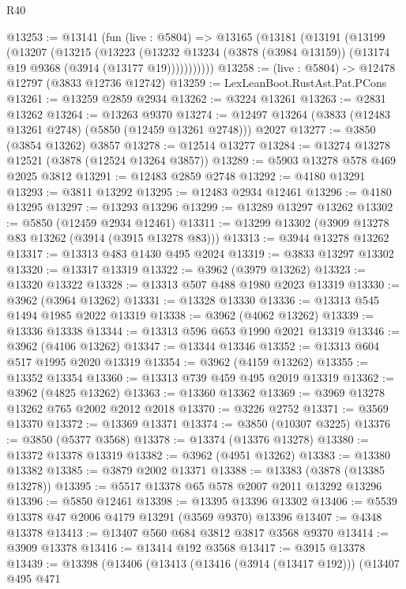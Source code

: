 \begin{lexlean}{R40}
\begin{coremodule}
@13253 := @13141
    (fun (live : @5804) =>
    @13165
      (@13181
        (@13191
          (@13199
            (@13207
              (@13215
                (@13223
                  (@13232
                    @13234
                    (@3878 (@3984 @13159))
                    (@13174 @19 @9368 (@3914 (@13177 @19)))))))))))
@13258 := (live : @5804) -> @12478 @12797 (@3833 @12736 @12742)
@13259 := LexLeanBoot.RustAst.Pat.PCons
@13261 := @13259 @2859 @2934
@13262 := @3224 @13261
@13263 := @2831 @13262
@13264 := @13263 @9370
@13274 := @12497 @13264 (@3833 (@12483 @13261 @2748) (@5850 (@12459 @13261 @2748))) @2027
@13277 := @3850 (@3854 @13262) @3857
@13278 := @12514 @13277
@13284 := @13274 @13278 @12521 (@3878 (@12524 @13264 @3857))
@13289 := @5903 @13278 @578 @469 @2025 @3812
@13291 := @12483 @2859 @2748
@13292 := @4180 @13291
@13293 := @3811 @13292
@13295 := @12483 @2934 @12461
@13296 := @4180 @13295
@13297 := @13293 @13296
@13299 := @13289 @13297 @13262
@13302 := @5850 (@12459 @2934 @12461)
@13311 := @13299 @13302 (@3909 @13278 @83 @13262 (@3914 (@3915 @13278 @83)))
@13313 := @3944 @13278 @13262
@13317 := @13313 @483 @1430 @495 @2024
@13319 := @3833 @13297 @13302
@13320 := @13317 @13319
@13322 := @3962 (@3979 @13262)
@13323 := @13320 @13322
@13328 := @13313 @507 @488 @1980 @2023 @13319
@13330 := @3962 (@3964 @13262)
@13331 := @13328 @13330
@13336 := @13313 @545 @1494 @1985 @2022 @13319
@13338 := @3962 (@4062 @13262)
@13339 := @13336 @13338
@13344 := @13313 @596 @653 @1990 @2021 @13319
@13346 := @3962 (@4106 @13262)
@13347 := @13344 @13346
@13352 := @13313 @604 @517 @1995 @2020 @13319
@13354 := @3962 (@4159 @13262)
@13355 := @13352 @13354
@13360 := @13313 @739 @459 @495 @2019 @13319
@13362 := @3962 (@4825 @13262)
@13363 := @13360 @13362
@13369 := @3969 @13278 @13262 @765 @2002 @2012 @2018
@13370 := @3226 @2752
@13371 := @3569 @13370
@13372 := @13369 @13371
@13374 := @3850 (@10307 @3225)
@13376 := @3850 (@5377 @3568)
@13378 := @13374 (@13376 @13278)
@13380 := @13372 @13378 @13319
@13382 := @3962 (@4951 @13262)
@13383 := @13380 @13382
@13385 := @3879 @2002 @13371
@13388 := @13383 (@3878 (@13385 @13278))
@13395 := @5517 @13378 @65 @578 @2007 @2011 @13292 @13296
@13396 := @5850 @12461
@13398 := @13395 @13396 @13302
@13406 := @5539 @13378 @47 @2006 @4179 @13291 (@3569 @9370) @13396
@13407 := @4348 @13378
@13413 := @13407 @560 @684 @3812 @3817 @3568 @9370
@13414 := @3909 @13378
@13416 := @13414 @192 @3568
@13417 := @3915 @13378
@13439 := @13398
    (@13406
      (@13413
        (@13416 (@3914 (@13417 @192)))
        (@13407
          @495
          @471

\end{coremodule}
\end{lexlean}

